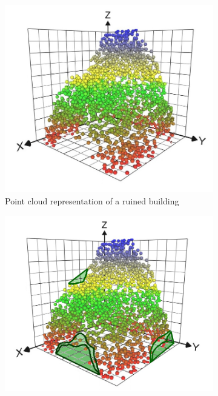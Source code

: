 \documentclass[12pt,a4paper]{article}
\begin{document}
    \begin{figure}
        \centering
        \begin{subfigure}[b]{0.475\textwidth}
            \centering
            \includegraphics[width=\textwidth]{scatter1.jpg}
            \caption[]{{\small Point cloud representation of a ruined building}}    
            \label{fig:scatter}
        \end{subfigure}
        \hfill
        \begin{subfigure}[b]{0.475\textwidth}  
            \centering 
            \includegraphics[width=\textwidth]{missing2.png}

\end{subfigure}
\end{figure}
\end{document}
